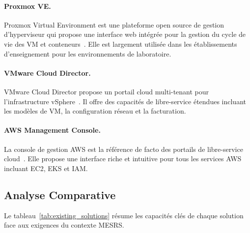 \paragraph{Proxmox VE.}
Proxmox Virtual Environment est une plateforme open source de gestion d'hyperviseur
qui propose une interface web intégrée pour la gestion du cycle de vie des VM et
conteneurs~\cite{proxmox_docs}. Elle est largement utilisée dans les établissements
d'enseignement pour les environnements de laboratoire.

\paragraph{VMware Cloud Director.}
VMware Cloud Director propose un portail cloud multi-tenant pour l'infrastructure
vSphere~\cite{vmware_vcd}. Il offre des capacités de libre-service étendues incluant
les modèles de VM, la configuration réseau et la facturation.

\paragraph{AWS Management Console.}
La console de gestion AWS est la référence de facto des portails de libre-service
cloud~\cite{aws_console}. Elle propose une interface riche et intuitive pour tous
les services AWS incluant EC2, EKS et IAM.

\subsection{Analyse Comparative}

Le tableau~\ref{tab:existing_solutions} résume les capacités clés de chaque solution
face aux exigences du contexte MESRS.

